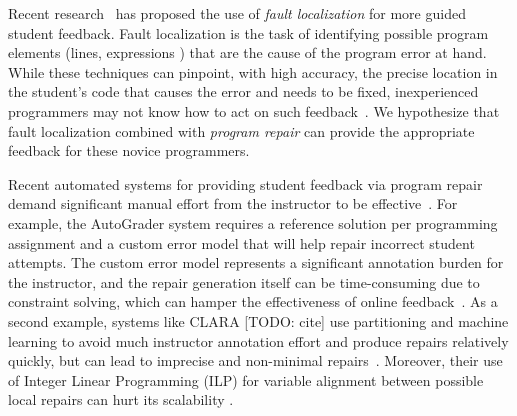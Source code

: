 Recent research~\citep[][]{Seidel:2017, Zhang2014-lv} has proposed the use of
\emph{fault localization} for more guided student feedback. Fault localization is the
task of identifying possible program elements (\eg lines, expressions \etc) that
are the cause of the program error at hand. While these techniques can pinpoint,
with high accuracy, the precise location in the student's code that causes the
error and needs to be fixed, inexperienced programmers may not know how to act on
such feedback~\cite{FIXME}. We hypothesize that fault localization combined with
\emph{program repair}
can provide the appropriate feedback for these novice programmers.

Recent automated systems for providing student feedback via program repair
demand significant manual effort from the instructor to be
effective~\cite{FIXME}. For example, the AutoGrader system requires a
reference solution per programming assignment and a custom error model that
will help
repair incorrect student attempts. The custom error model represents a
significant annotation burden for the instructor, and the repair generation
itself can be time-consuming due to constraint solving, which can hamper
the effectiveness of online feedback~\cite{FIXME}.
As a second example, systems like CLARA [TODO: cite] use
partitioning and machine learning to avoid much instructor annotation effort
and produce repairs relatively quickly, but can
lead to
imprecise and non-minimal repairs~\cite{FIXME}.
Moreover, their use of Integer Linear
Programming (ILP) for variable alignment between possible local repairs can hurt
its scalability .

